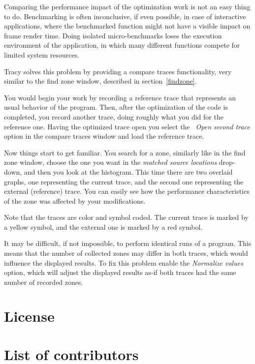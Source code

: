 \documentclass[hidelinks,titlepage,a4paper]{article}
\begin{document}
Comparing the performance impact of the optimization work is not an easy thing to do. Benchmarking is often inconclusive, if even possible, in case of interactive applications, where the benchmarked function might not have a visible impact on frame render time. Doing isolated micro-benchmarks loses the execution environment of the application, in which many different functions compete for limited system resources.

Tracy solves this problem by providing a compare traces functionality, very similar to the find zone window, described in section~\ref{findzone}.

You would begin your work by recording a reference trace that represents an usual behavior of the program. Then, after the optimization of the code is completed, you record another trace, doing roughly what you did for the reference one. Having the optimized trace open you select the \emph{\faFolderOpen{}~Open second trace} option in the compare traces window and load the reference trace.

Now things start to get familiar. You search for a zone, similarly like in the find zone window, choose the one you want in the \emph{matched source locations} drop-down, and then you look at the histogram. This time there are two overlaid graphs, one representing the current trace, and the second one representing the external (reference) trace. You can easily see how the performance characteristics of the zone was affected by your modifications.

Note that the traces are color and symbol coded. The current trace is marked by a yellow \faLemon{} symbol, and the external one is marked by a red \faGem{} symbol.

It may be difficult, if not impossible, to perform identical runs of a program. This means that the number of collected zones may differ in both traces, which would influence the displayed results. To fix this problem enable the \emph{Normalize values} option, which will adjust the displayed results as-if both traces had the same number of recorded zones.

\newpage
\appendix
\appendixpage

\section{License}



\section{List of contributors}


\end{document}
